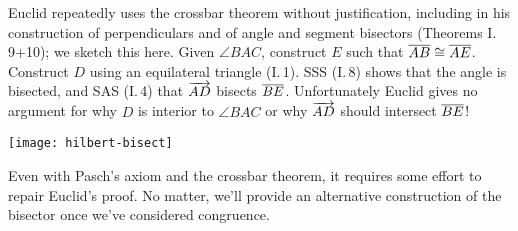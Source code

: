 \begin{minipage}[t]{0.67\linewidth}\vspace{-3pt}
	Euclid repeatedly uses the crossbar theorem without justification, including in his construction of perpendiculars and of angle and segment bisectors (Theorems I.\,9+10); we sketch this here.\smallbreak
	Given $\angle BAC$, construct $E$ such that $\overline{AB}\cong\overline{AE}$. Construct $D$ using an equilateral triangle (I.\,1). SSS (I.\,8) shows that the angle is bisected, and SAS (I.\,4) that $\overrightarrow{AD}$ bisects $\overline{BE}$.\smallbreak
	Unfortunately Euclid gives no argument for why $D$ is interior to $\angle BAC$ or why $\overrightarrow{AD}$ should intersect $\overline{BE}$!
\end{minipage}
\hfill
\begin{minipage}[t]{0.32\linewidth}\vspace{0pt}
	\flushright
	\texttt{[image: hilbert-bisect]}
\end{minipage}
\medbreak


Even with Pasch's axiom and the crossbar theorem, it requires some effort to repair Euclid's proof. No matter, we'll provide an alternative construction of the bisector once we've considered congruence.

\goodbreak


